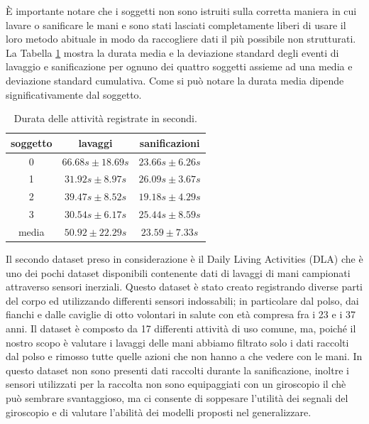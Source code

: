 \`E importante notare che i soggetti non sono istruiti sulla corretta maniera in cui lavare o sanificare le mani e sono stati lasciati completamente liberi di usare il loro metodo abituale in modo da raccogliere dati il più possibile non strutturati. La Tabella \ref{tab:activity-duration} mostra la durata media e la deviazione standard degli eventi di lavaggio e sanificazione per ognuno dei quattro soggetti assieme ad una media e deviazione standard cumulativa. Come si può notare la durata media dipende significativamente dal soggetto.

\begin{table}
    \centering
    \begin{tabular}{c c c}
        \hline
        soggetto & lavaggi & sanificazioni  \\
        \hline
        0 & $66.68s \pm 18.69s$ & $23.66s \pm 6.26s$  \\
        1 & $31.92s \pm 8.97s$  & $26.09s \pm 3.67s$  \\
        2 & $39.47s \pm 8.52s$  & $19.18s \pm 4.29s$  \\
        3 & $30.54s \pm 6.17s$  & $25.44s \pm 8.59s$ \\
        \hline
        media & $50.92 \pm 22.29s$  & $23.59 \pm 7.33s$ \\
        \hline
    \end{tabular}
    \caption{Durata delle attività registrate in secondi.}
    \label{tab:activity-duration}
\end{table}

Il secondo dataset preso in considerazione è il Daily Living Activities (DLA) che è uno dei pochi dataset disponibili contenente dati di lavaggi di mani campionati attraverso sensori inerziali. Questo dataset è stato creato registrando diverse parti del corpo ed utilizzando differenti sensori indossabili; in particolare dal polso, dai fianchi e dalle caviglie di otto volontari in salute con età compresa fra i 23 e i 37 anni. Il dataset è composto da 17 differenti attività di uso comune, ma, poiché il nostro scopo è valutare i lavaggi delle mani abbiamo filtrato solo i dati raccolti dal polso e rimosso tutte quelle azioni che non hanno a che vedere con le mani. In questo dataset non sono presenti dati raccolti durante la sanificazione, inoltre i sensori utilizzati per la raccolta non sono equipaggiati con un giroscopio il chè può sembrare svantaggioso, ma ci consente di soppesare l'utilità dei segnali del giroscopio e di valutare l'abilità dei modelli proposti nel generalizzare.

